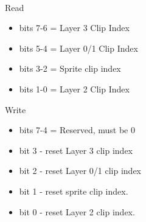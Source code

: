 \\
Read
\begin{itemize}
\item bits 7-6 = Layer 3 Clip Index
\item bits 5-4 = Layer 0/1 Clip Index
\item bits 3-2 = Sprite clip index
\item bits 1-0 = Layer 2 Clip Index
\end{itemize}
Write
\begin{itemize}
\item bits 7-4 = Reserved, must be 0
\item bit 3 - reset Layer 3 clip index
\item bit 2 - reset Layer 0/1 clip index
\item bit 1 - reset sprite clip index.
\item bit 0 - reset Layer 2 clip index.
\end{itemize}

